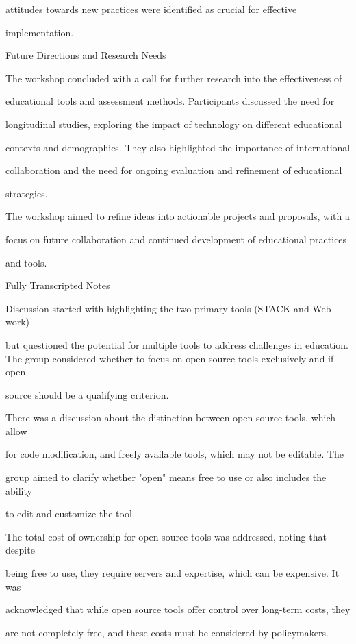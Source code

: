 \documentclass[11pt]{article}
\begin{document}
attitudes towards new practices were identified as crucial for effective

implementation.

Future Directions and Research Needs

The workshop concluded with a call for further research into the effectiveness of

educational tools and assessment methods. Participants discussed the need for

longitudinal studies, exploring the impact of technology on different educational

contexts and demographics. They also highlighted the importance of international

collaboration and the need for ongoing evaluation and refinement of educational

strategies.

The workshop aimed to refine ideas into actionable projects and proposals, with a

focus on future collaboration and continued development of educational practices

and tools.

Fully Transcripted Notes

Discussion started with highlighting the two primary tools (STACK and Web work)

but questioned the potential for multiple tools to address challenges in education. The group considered whether to focus on open source tools exclusively and if open

source should be a qualifying criterion.

There was a discussion about the distinction between open source tools, which allow

for code modification, and freely available tools, which may not be editable. The

group aimed to clarify whether "open" means free to use or also includes the ability

to edit and customize the tool.

The total cost of ownership for open source tools was addressed, noting that despite

being free to use, they require servers and expertise, which can be expensive. It was

acknowledged that while open source tools offer control over long-term costs, they

are not completely free, and these costs must be considered by policymakers.
\end{document}

